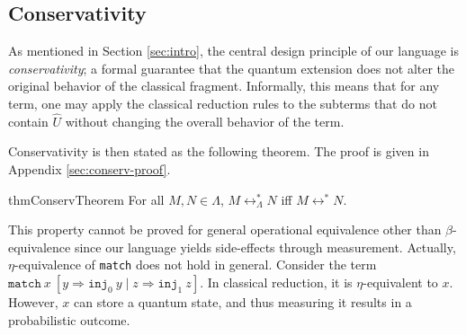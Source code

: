 \subsection{Conservativity}
As mentioned in Section \ref{sec:intro}, the central design principle of our language is \textit{conservativity}; a formal guarantee that the quantum extension does not alter the original behavior of the classical fragment.
Informally, this means that for any term, one may apply the classical reduction rules to the subterms that do not contain $\hat{U}$ without changing the overall behavior of the term.

Conservativity is then stated as the following theorem.
The proof is given in Appendix \ref{sec:conserv-proof}.
\begin{restatable}[Conservativity]{thm}{ConservTheorem} \label{thm:conservativity}
  For all $M, N \in \Lambda$, $M \longleftrightarrow^*_\Lambda N$ iff $M \longleftrightarrow^* N$.
\end{restatable}
This property cannot be proved for general operational equivalence other than $\beta$-equivalence since our language yields side-effects through measurement.
Actually, $\eta$-equivalence of \texttt{match} does not hold in general.
Consider the term $\texttt{match}\ x\ [y\Rightarrow \texttt{inj}_0\ y\mid z\Rightarrow \texttt{inj}_1\ z]$.
In classical reduction, it is $\eta$-equivalent to $x$.
However, $x$ can store a quantum state, and thus measuring it results in a probabilistic outcome.


